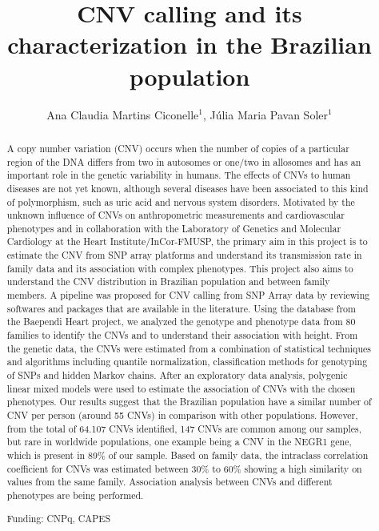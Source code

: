 \documentclass[twoside]{article}
\title{\vspace{-15mm}\fontsize{24pt}{10pt}\selectfont\textbf{CNV calling and its characterization in the Brazilian population}} %
\author{Ana Claudia Martins Ciconelle$^1$, J\'ulia Maria Pavan Soler$^1$}
\affil{1 INSTITUTO DE MATEM\'ATICA E ESTAT\'ISTICA - IME/USP\\ }
\date{}
\begin{document}
\maketitle %

\thispagestyle{fancy} %


\begin{abstract}
A copy number variation (CNV) occurs when the number of copies of a particular
region of the DNA differs from two in autosomes or one/two in allosomes and has an
important role in the genetic variability in humans. The effects of CNVs to human
diseases are not yet known, although several diseases have been associated to this kind
of polymorphism, such as uric acid and nervous system disorders. 
Motivated by the unknown influence of CNVs on anthropometric measurements and
cardiovascular phenotypes and in collaboration with the Laboratory of Genetics and
Molecular Cardiology at the Heart Institute/InCor-FMUSP, the primary aim in this
project is to estimate the CNV from SNP array platforms and understand its
transmission rate in family data and its association with complex phenotypes.  This
project also aims to understand the CNV distribution in Brazilian population and
between family members.
A pipeline was proposed for CNV calling from SNP Array data by reviewing softwares
and packages that are available in the literature. Using the database from the Baependi
Heart project, we analyzed the genotype and phenotype data from 80 families to identify
the CNVs and to understand their association with height. From the genetic data, the
CNVs were estimated from a combination of statistical techniques and algorithms
including quantile normalization, classification methods for genotyping of SNPs and
hidden Markov chains. After an exploratory data analysis, polygenic linear mixed
models were used to estimate the association of CNVs with the chosen phenotypes. 
Our results suggest that the Brazilian population have a similar number of CNV per
person (around 55 CNVs) in comparison with other populations. However, from the
total of 64.107 CNVs identified, 147 CNVs are common among our samples, but rare in
worldwide populations, one example being a CNV in the NEGR1 gene, which is present
in 89\% of our sample. Based on family data, the intraclass correlation coefficient for
CNVs was estimated between 30\% to 60\% showing a high similarity on values from the
same family. Association analysis between CNVs and different phenotypes are being
performed.

Funding: CNPq, CAPES
\end{abstract}
\end{document}
